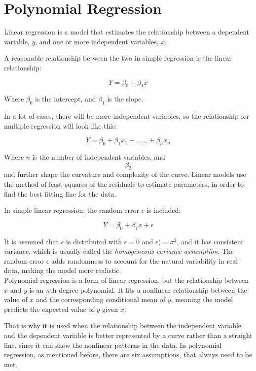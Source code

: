 
\section*{Polynomial Regression}
Linear regression is a model that estimates the relationship between a dependent variable, \( y \), and one or more independent variables, \( x \).

A reasonable relationship between the two in simple regression is the linear relationship:

\[
Y = \beta_0 + \beta_1 x
\]

Where \( \beta_0 \) is the intercept, and \( \beta_1 \) is the slope.

In a lot of cases, there will be more independent variables, so the relationship for multiple regression will look like this:

\[
Y = \beta_0 + \beta_1 x_1 + ......+ \beta_n x_n
\]



Where \( n \) is the number of independent variables, and $$\beta_2$$ and further shape the curvature and complexity of the curve. Linear models use the method of least squares of the residuals to estimate parameters, in order to find the best fitting line for the data.

In simple linear regression, the random error \( \epsilon \) is included:

\[
Y = \beta_0 + \beta_1 x + \epsilon
\]

It is assumed that \( \epsilon \) is distributed with $\epsilon = 0$ and $\epsilon) = \sigma^2$, and it has consistent variance, which is usually called the \textit{homogeneous variance assumption}. The random error \( \epsilon \) adds randomness to account for the natural variability in real data, making the model more realistic.
\newline\\
Polynomial regression is a form of linear regression, but the relationship between \( x \) and \( y \) is an \( n \)th-degree polynomial. It fits a nonlinear relationship between the value of \( x \) and the corresponding conditional mean of \( y \), meaning the model predicts the expected value of \( y \) given \( x \).

That is why it is used when the relationship between the independent variable and the dependent variable is better represented by a curve rather than a straight line, since it can show the nonlinear patterns in the data.
In polynomial regression, as mentioned before, there are six assumptions, that always need to be met.



